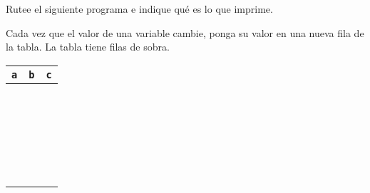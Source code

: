 Rutee el siguiente programa
e indique qué es lo que imprime.

Cada vez que el valor de una variable cambie,
ponga su valor en una nueva fila de la tabla.
La tabla tiene filas de sobra.

\begin{minipage}[T]{.5\textwidth}
  
  \framebox[.8\textwidth]{\rule[10ex]{0pt}{0pt}}
\end{minipage}
\begin{minipage}[t]{.4\textwidth}\centering
  \newcommand{\cc}[1]{\hfil\texttt{#1}\hfil}
  \begin{tabular}{|p{4em}|p{4em}|p{4em}|}\hline
      \cc{a} & \cc{b} & \cc{c} \\ \hline\hline
      && \\\hline
      && \\\hline
      && \\\hline
      && \\\hline
      && \\\hline
      && \\\hline
      && \\\hline
      && \\\hline
      && \\\hline
      && \\\hline
      && \\\hline
      && \\\hline
      && \\\hline
      && \\\hline
      && \\\hline
      && \\\hline
      && \\\hline
      && \\\hline
      && \\\hline
      && \\\hline
      && \\\hline
      && \\\hline
      && \\\hline
      && \\\hline
   \end{tabular}
\end{minipage}

